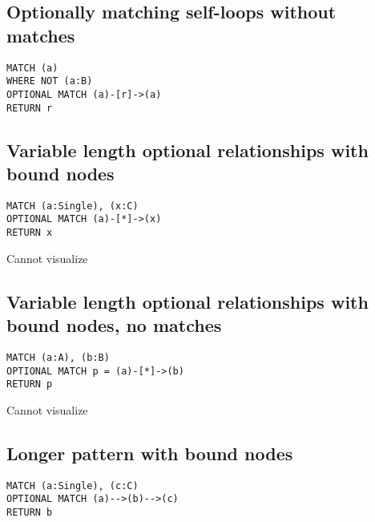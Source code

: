 \subsection{Optionally matching self-loops without matches}

\begin{lstlisting}
MATCH (a)
WHERE NOT (a:B)
OPTIONAL MATCH (a)-[r]->(a)
RETURN r
\end{lstlisting}

\subsection{Variable length optional relationships with bound nodes}

\begin{lstlisting}
MATCH (a:Single), (x:C)
OPTIONAL MATCH (a)-[*]->(x)
RETURN x
\end{lstlisting}

Cannot visualize
\subsection{Variable length optional relationships with bound nodes, no matches}

\begin{lstlisting}
MATCH (a:A), (b:B)
OPTIONAL MATCH p = (a)-[*]->(b)
RETURN p
\end{lstlisting}

Cannot visualize
\subsection{Longer pattern with bound nodes}

\begin{lstlisting}
MATCH (a:Single), (c:C)
OPTIONAL MATCH (a)-->(b)-->(c)
RETURN b
\end{lstlisting}

